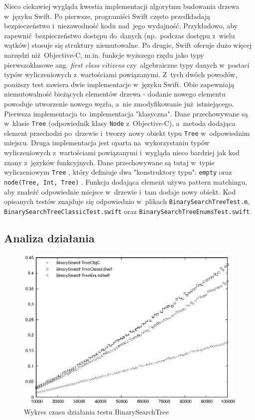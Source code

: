 \documentclass[mgr, shortabstract]{iithesis}
\newcommand{\ang}[1]{ang. \textit{#1}}
\newcommand{\swiftinline}[1]{
    \texttt{#1}
}
\newcommand{\objcinline}[1]{
    \texttt{#1}
}
\begin{document}
Nieco ciekawiej wygląda kwestia implementacji algorytmu budowania drzewa w~języku Swift. Po pierwsze, programiści Swift często przedkładają bezpieczeństwo i~niezawodność kodu nad~jego wydajność. Przykładowo, aby zapewnić bezpieczeństwo dostępu do~danych (np.~podczas dostępu z~wielu wątków) stosuje się struktury niemutowalne. Po drugie, Swift oferuje dużo więcej narzędzi niż Objective-C, m.in. funkcje wyższego rzędu jako typy pierwszoklasowe \ang{first class citizens} czy~algebraiczne typy danych w~postaci typów wyliczeniowych z~wartościami powiązanymi. Z~tych dwóch powodów, poniższy test zawiera dwie implementacje w~języku Swift. Obie zapewniają niemutowalność bieżących elementów drzewa - dodanie nowego elementu powoduje utworzenie nowego węzła, a~nie zmodyfikowanie już istniejącego. Pierwsza implementacja to~implementacja "klasyczna". Dane przechowywane są w~klasie \swiftinline{Tree} (odpowiednik klasy \objcinline{Node} z~Objective-C), a~metoda dodająca element przechodzi po~drzewie i~tworzy nowy obiekt typu \swiftinline{Tree} w~odpowiednim miejscu. Druga implementacja jest oparta na~wykorzystaniu typów wyliczeniowych z~wartościami powiązanymi i~wygląda nieco bardziej jak kod znany z~języków funkcyjnych. Dane przechowywane są tutaj w~typie wyliczeniowym \swiftinline{Tree}, który definiuje dwa "konstruktory typu": \swiftinline{empty} oraz \swiftinline{node(Tree, Int, Tree)}. Funkcja dodająca element używa pattern matchingu, aby znaleźć odpowiednie miejsce w~drzewie i~tam dodaje nowy obiekt. Kod opisanych testów znajduje się odpowiednio w~plikach \texttt{BinarySearchTreeTest.m}, \texttt{BinarySearchTreeClassicTest.swift} oraz \texttt{BinarySearchTreeEnumsTest.swift}.

\subsection{Analiza działania}

\begin{figure}
    \includegraphics{plots/BinarySearchTree.eps}
    \caption{Wykres czasu działania testu BinarySearchTree}
    \label{p:binary_search}
\end{figure}
\end{document}
